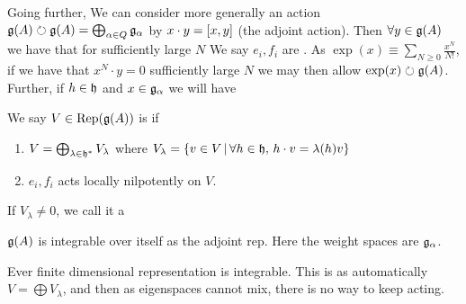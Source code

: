 \documentclass{article}
\begin{document}
Going further, We can consider more generally an action $\mf{g}(A) \lact \mf{g}(A) = \bigoplus_{\alpha \in Q} \mf{g}_\alpha$ by $x \cdot y = \comm[x]{y}$ (the adjoint action). Then $\forall y \in \mf{g}(A)$ we have that for sufficiently large $N$ 
We say $e_i, f_i$ are . As $\exp(x) \equiv \sum_{N \geq 0} \frac{x^N}{N!}$, if we have that $x^N \cdot y=0$ sufficiently large $N$ we may then allow $\exp(x) \lact \mf{g}(A)$. Further, if $h \in \mf{h}$ and $x \in \mf{g}_\alpha$ we will have 

\begin{definition}
We say $V \in \Rep(\mf{g}(A))$ is  if 
\begin{enumerate}
    \item $V = \bigoplus_{\lambda \in \mf{h}^\ast} V_\lambda$ where $V_\lambda = \pbrace{v \in V \, | \, \forall h \in \mf{h}, \, h \cdot v = \lambda(h)v}$
    \item $e_i,f_i$ acts locally nilpotently on $V$. 
\end{enumerate}
\end{definition}

\begin{definition}
If $V_\lambda \neq 0$, we call it a  
\end{definition}

\begin{example}
$\mf{g}(A)$ is integrable over itself as the adjoint rep. Here the weight spaces are $\mf{g}_\alpha$. 
\end{example}

\begin{example}
Ever finite dimensional representation is integrable. This is as automatically $V = \bigoplus V_\lambda$, and then as eigenspaces cannot mix, there is no way to keep acting. 
\end{example}
\end{document}
